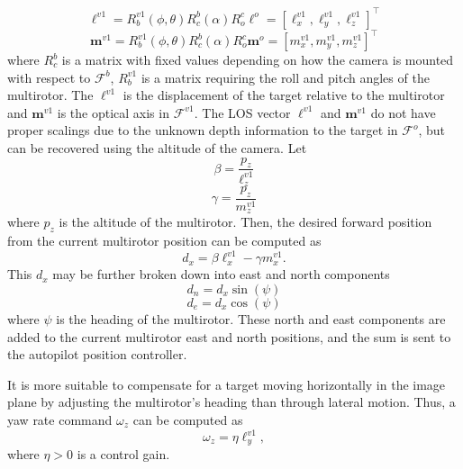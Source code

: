 \begin{equation}
\mathbf{\ell}^{v1}=R^{v1}_b(\phi,\theta)R^b_c(\alpha)R^c_o\ell^o=[\ell^{v1}_x, \ell^{v1}_y, \ell^{v1}_z]^\top
\end{equation}
\begin{equation}
\mathbf{m}^{v1}=R^{v1}_b(\phi,\theta)R^b_c(\alpha)R^c_o\mathbf{m}^o=[m^{v1}_x, m^{v1}_y, m^{v1}_z]^\top
\end{equation} where $R^b_c$ is a matrix with fixed values depending on how the camera is mounted with respect to $\mathcal{F}^b$, $R^{v1}_b$ is a matrix requiring the roll and pitch angles of the multirotor. The $\ell^{v1}$ is the displacement of the target relative to the multirotor and $\mathbf{m}^{v1}$ is the optical axis in $\mathcal{F}^{v1}$. The LOS vector $\ell^{v1}$ and $\mathbf{m}^{v1}$ do not have proper scalings due to the unknown depth information to the target in $\mathcal{F}^o$, but can be recovered using the altitude of the camera. Let
\begin{equation}
\beta=\frac{p_z}{\ell^{v1}_z}
\end{equation} 
\begin{equation}
\gamma=\frac{p_z}{m^{v1}_z}
\end{equation} where $p_z$ is the altitude of the multirotor. Then, the desired forward position from the current multirotor position can be computed as 
\begin{equation}
d_x=\beta\ell^{v1}_x-\gamma{m}^{v1}_x.
\end{equation}
This $d_x$ may be further broken down into east and north components
\begin{equation}
d_n=d_x\sin(\psi)
\end{equation}
\begin{equation}
d_e=d_x\cos(\psi)
\end{equation} where $\psi$ is the heading of the multirotor. These north and east components are added to the current multirotor east and north positions, and the sum is sent to the autopilot position controller.

It is more suitable to compensate for a target moving horizontally in the image plane by adjusting the multirotor's heading than through lateral motion. Thus, a yaw rate command $\omega_z$ can be computed as 
\begin{equation}
\omega_z=\eta \ell^{v1}_y,
\end{equation} where $\eta>0$ is a control gain.

